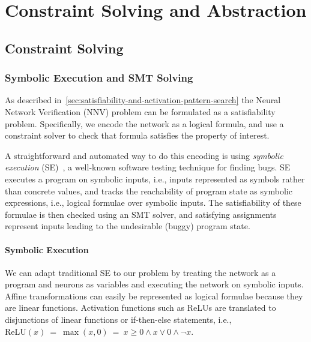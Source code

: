 \documentclass[oneside,11pt,dvipsnames]{book}
\numberwithin{equation}{section}
\theoremstyle{definition}
\theoremstyle{remark}
\newcommand{\relu}[1]{\mathrm{ReLU}\left(#1\right)}
\begin{document}



\part{Constraint Solving and Abstraction}\label{part:constraint-solving-abstraction}

\chapter{Constraint Solving}\label{chap:constraint-solving}

\section{Symbolic Execution and SMT Solving}\label{sec:se-smt}
As described in~\autoref{sec:satisfiability-and-activation-pattern-search} the Neural Network Verification (NNV) problem can be formulated as a satisfiability problem. Specifically, we encode the network as a logical formula, and use a constraint solver to check that formula satisfies the property of interest.

A straightforward and automated way to do this encoding is using \emph{symbolic execution} (SE)~\cite{baldoni2018survey,king1976symbolic}, a well-known software testing technique for finding bugs.  SE executes a program on symbolic inputs, i.e., inputs represented as symbols rather than concrete values, and tracks the reachability of program state as symbolic expressions, i.e., logical formulae over symbolic inputs. The satisfiability of these formulae is then checked using an SMT solver, and satisfying assignments represent inputs leading to the undesirable (buggy) program state.

\subsection{Symbolic Execution}\label{sec:se}
We can adapt traditional SE to our problem by treating the network as a program and neurons as variables and executing the network on symbolic inputs. Affine transformations can easily be represented as logical formulae because they are linear functions. Activation functions such as ReLUs are translated to disjunctions of linear functions or if-then-else statements, i.e., $\relu{x} ~=~ \max(x,0) ~=~ x \ge 0 \land x \lor 0 \land \neg x$.
\end{document}
